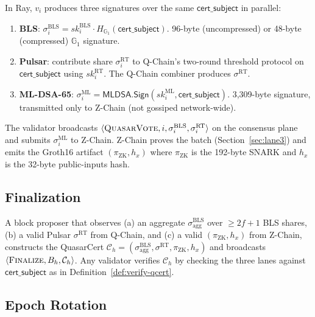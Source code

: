 In Ray, $v_i$ produces three signatures over the same
$\mathsf{cert\_subject}$ in parallel:

\begin{enumerate}[leftmargin=2em]
\item \textbf{BLS}: $\sigma_i^{\mathrm{BLS}} = \mathit{sk}_i^{\mathrm{BLS}}
      \cdot H_{\mathbb{G}_1}(\mathsf{cert\_subject})$.
      96-byte (uncompressed) or 48-byte (compressed) $\mathbb{G}_1$
      signature.
\item \textbf{Pulsar}: contribute share $\sigma_i^{\mathrm{RT}}$ to
      Q-Chain's two-round threshold protocol on
      $\mathsf{cert\_subject}$ using $\mathit{sk}_i^{\mathrm{RT}}$. The
      Q-Chain combiner produces $\sigma^{\mathrm{RT}}$.
\item \textbf{ML-DSA-65}: $\sigma_i^{\mathrm{ML}} =
      \mathsf{MLDSA.Sign}(\mathit{sk}_i^{\mathrm{ML}},
      \mathsf{cert\_subject})$. 3{,}309-byte signature, transmitted only
      to Z-Chain (not gossiped network-wide).
\end{enumerate}

The validator broadcasts $\langle \textsc{QuasarVote}, i,
\sigma_i^{\mathrm{BLS}}, \sigma_i^{\mathrm{RT}} \rangle$ on the consensus
plane and submits $\sigma_i^{\mathrm{ML}}$ to Z-Chain. Z-Chain proves the
batch (Section~\ref{sec:lane3}) and emits the Groth16 artifact
$(\pi_{\mathrm{ZK}}, h_x)$ where $\pi_{\mathrm{ZK}}$ is the 192-byte
SNARK and $h_x$ is the 32-byte public-inputs hash.

\subsection{Finalization}

A block proposer that observes (a) an aggregate
$\sigma^{\mathrm{BLS}}_{\mathrm{agg}}$ over $\geq 2f+1$ BLS shares,
(b) a valid Pulsar $\sigma^{\mathrm{RT}}$ from Q-Chain, and (c) a valid
$(\pi_{\mathrm{ZK}}, h_x)$ from Z-Chain, constructs the QuasarCert
$\mathcal{C}_h = (\sigma^{\mathrm{BLS}}_{\mathrm{agg}},
\sigma^{\mathrm{RT}}, \pi_{\mathrm{ZK}}, h_x)$ and broadcasts
$\langle \textsc{Finalize}, B_h, \mathcal{C}_h \rangle$. Any validator
verifies $\mathcal{C}_h$ by checking the three lanes against
$\mathsf{cert\_subject}$ as in Definition~\ref{def:verify-qcert}.

\subsection{Epoch Rotation}

